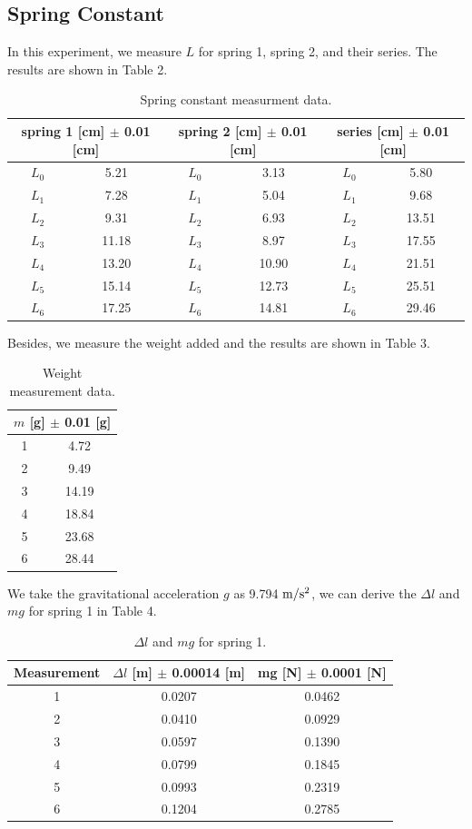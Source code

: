 \documentclass[a4paper]{report}
\begin{document}
	\subsection{Spring Constant}
	In this experiment, we measure $L$ for spring 1, spring 2, and their series. The results are shown in Table 2.
	\begin{table}[H]
		\centering
		\begin{tabular}{|c|c||c|c||c|c|}
			\hline
			\multicolumn{2}{|c||}{spring 1 [cm] $\pm$ 0.01 [cm]}&\multicolumn{2}{|c||}{spring 2 [cm] $\pm$ 0.01 [cm]}&\multicolumn{2}{|c|}{series [cm] $\pm$ 0.01 [cm]}\\
			\hline
			$L_0$&5.21&$L_0$&3.13&$L_0$&5.80\\
			\hline
			$L_1$&7.28&$L_1$&5.04&$L_1$&9.68\\
			\hline
			$L_2$&9.31&$L_2$&6.93&$L_2$&13.51\\
			\hline
			$L_3$&11.18&$L_3$&8.97&$L_3$&17.55\\
			\hline
			$L_4$&13.20&$L_4$&10.90&$L_4$&21.51\\
			\hline
			$L_5$&15.14&$L_5$&12.73&$L_5$&25.51\\
			\hline
			$L_6$&17.25&$L_6$&14.81&$L_6$&29.46\\
			\hline
		\end{tabular}
		\caption{Spring constant measurment data.}
	\end{table}
	Besides, we measure the weight added and the results are shown in Table 3.
	\begin{table}[H]
		\centering
		\begin{tabular}{|c|c|}
			\hline
			\multicolumn{2}{|c|}{$m$ [g] $\pm$ 0.01 [g]}\\
			\hline
			1&4.72\\
			\hline
			2&9.49\\
			\hline
			3&14.19\\
			\hline
			4&18.84\\
			\hline
			5&23.68\\
			\hline
			6&28.44\\
			\hline
		\end{tabular}
	\caption{Weight measurement data.}
	\end{table}
	We take the gravitational acceleration $g$ as 9.794 $\rm{m/s^2}$, we can derive the $\Delta l$ and $mg$ for spring 1 in Table 4.
	\begin{table}[H]
		\centering
		\begin{tabular}{|c|c|c|}
			\hline
			Measurement&$\Delta l$ [m] $\pm$ 0.00014 [m]&mg [N] $\pm$ 0.0001 [N]\\
			\hline
			1&0.0207&0.0462\\
			\hline
			2&0.0410&0.0929\\
			\hline
			3&0.0597&0.1390\\
			\hline
			4&0.0799&0.1845\\
			\hline
			5&0.0993&0.2319\\
			\hline
			6&0.1204&0.2785\\
			\hline
		\end{tabular}
	\caption{$\Delta l$ and $mg$ for spring 1.}
	\end{table}
\end{document}
